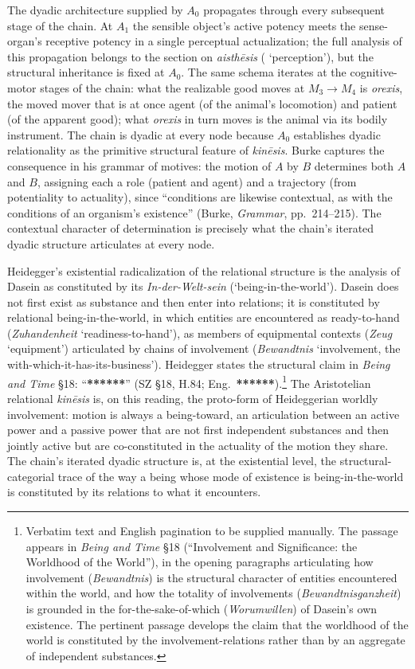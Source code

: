 The dyadic architecture supplied by $A_0$ propagates through every subsequent stage of the chain. At $A_1$ the sensible object's active potency meets the sense-organ's receptive potency in a single perceptual actualization; the full analysis of this propagation belongs to the section on \textit{aisthēsis} ( `perception'), but the structural inheritance is fixed at $A_0$. The same schema iterates at the cognitive-motor stages of the chain: what the realizable good moves at $M_3 \rightarrow M_4$ is \textit{orexis}, the moved mover that is at once agent (of the animal's locomotion) and patient (of the apparent good); what \textit{orexis} in turn moves is the animal via its bodily instrument. The chain is dyadic at every node because $A_0$ establishes dyadic relationality as the primitive structural feature of \textit{kinēsis}. Burke captures the consequence in his grammar of motives: the motion of $A$ by $B$ determines both $A$ and $B$, assigning each a role (patient and agent) and a trajectory (from potentiality to actuality), since ``conditions are likewise contextual, as with the conditions of an organism's existence'' (Burke, \textit{Grammar}, pp.~214--215). The contextual character of determination is precisely what the chain's iterated dyadic structure articulates at every node.

Heidegger's existential radicalization of the relational structure is the analysis of Dasein as constituted by its \textit{In-der-Welt-sein} (`being-in-the-world'). Dasein does not first exist as substance and then enter into relations; it is constituted by relational being-in-the-world, in which entities are encountered as ready-to-hand (\textit{Zuhandenheit} `readiness-to-hand'), as members of equipmental contexts (\textit{Zeug} `equipment') articulated by chains of involvement (\textit{Bewandtnis} `involvement, the with-which-it-has-its-business'). Heidegger states the structural claim in \textit{Being and Time} \S 18: ``\textbf{******}'' (SZ \S 18, H.84; Eng.~\textbf{******}).\footnote{Verbatim text and English pagination to be supplied manually. The passage appears in \textit{Being and Time} \S 18 (``Involvement and Significance: the Worldhood of the World''), in the opening paragraphs articulating how involvement (\textit{Bewandtnis}) is the structural character of entities encountered within the world, and how the totality of involvements (\textit{Bewandtnisganzheit}) is grounded in the for-the-sake-of-which (\textit{Worumwillen}) of Dasein's own existence. The pertinent passage develops the claim that the worldhood of the world is constituted by the involvement-relations rather than by an aggregate of independent substances.} The Aristotelian relational \textit{kinēsis} is, on this reading, the proto-form of Heideggerian worldly involvement: motion is always a being-toward, an articulation between an active power and a passive power that are not first independent substances and then jointly active but are co-constituted in the actuality of the motion they share. The chain's iterated dyadic structure is, at the existential level, the structural-categorial trace of the way a being whose mode of existence is being-in-the-world is constituted by its relations to what it encounters.

